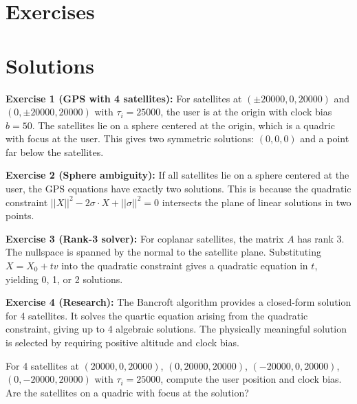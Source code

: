 \section{Exercises}
\section{Solutions}
\label{sec:gps:solutions}

\begin{solution}
\textbf{Exercise 1 (GPS with 4 satellites):} For satellites at $(\pm 20000, 0, 20000)$ and $(0, \pm 20000, 20000)$ with $\tau_i = 25000$, the user is at the origin with clock bias $b = 50$. The satellites lie on a sphere centered at the origin, which is a quadric with focus at the user. This gives two symmetric solutions: $(0,0,0)$ and a point far below the satellites.
\end{solution}

\begin{solution}
\textbf{Exercise 2 (Sphere ambiguity):} If all satellites lie on a sphere centered at the user, the GPS equations have exactly two solutions. This is because the quadratic constraint $||X||^2 - 2\sigma \cdot X + ||\sigma||^2 = 0$ intersects the plane of linear solutions in two points.
\end{solution}

\begin{solution}
\textbf{Exercise 3 (Rank-3 solver):} For coplanar satellites, the matrix $A$ has rank 3. The nullspace is spanned by the normal to the satellite plane. Substituting $X = X_0 + t v$ into the quadratic constraint gives a quadratic equation in $t$, yielding 0, 1, or 2 solutions.
\end{solution}

\begin{solution}
\textbf{Exercise 4 (Research):} The Bancroft algorithm provides a closed-form solution for 4 satellites. It solves the quartic equation arising from the quadratic constraint, giving up to 4 algebraic solutions. The physically meaningful solution is selected by requiring positive altitude and clock bias.
\end{solution}

\label{sec:gps:exercises}

\begin{exercise}
For 4 satellites at $(20000,0,20000)$, $(0,20000,20000)$,
$(-20000,0,20000)$, $(0,-20000,20000)$ with $\tau_i = 25000$,
compute the user position and clock bias. Are the satellites on
a quadric with focus at the solution?
\end{exercise}

